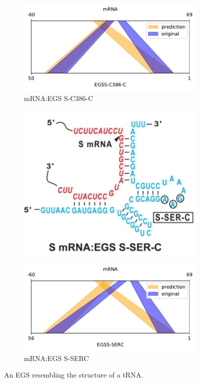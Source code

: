 \documentclass[twoside,a4paper]{report}
\begin{document}
\begin{figure}[h!tb]
\begin{subfigure}{.25\textwidth}
	 		\label{fig:sc386c}
	 	\end{subfigure}%
 	\begin{subfigure}{.5\textwidth}
 		\centering
 		\includegraphics[width=.9\linewidth]{rricomparison5}
 		\caption{mRNA:EGS S-C386-C}
 		\label{fig:rricomparison5}
 	\end{subfigure}
	 	\begin{subfigure}{.25\textwidth}
	 		\centering
	 		\includegraphics[width=.9\linewidth]{SERC}
	 		
	 		\label{fig:SERC}
	 	\end{subfigure}%
 	\begin{subfigure}{.5\textwidth}
 		\centering
 		\includegraphics[width=.9\linewidth]{rricomparison8}
 		\caption{mRNA:EGS S-SERC}
 		\label{fig:rricomparison8}
 	\end{subfigure}
 	\caption{An EGS resembling the structure of a tRNA.}
	 	\label{fig:test1}
	 \end{figure}
	 
\end{document}
